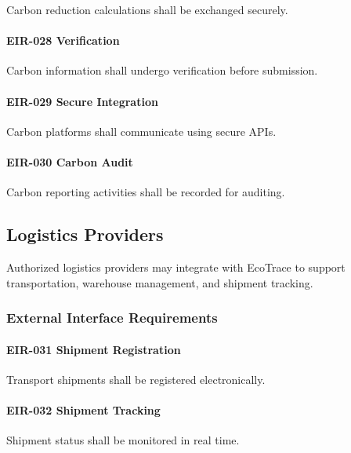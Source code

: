 Carbon reduction calculations shall be exchanged securely.

\paragraph{EIR-028 Verification}

Carbon information shall undergo verification before submission.

\paragraph{EIR-029 Secure Integration}

Carbon platforms shall communicate using secure APIs.

\paragraph{EIR-030 Carbon Audit}

Carbon reporting activities shall be recorded for auditing.


\subsection{Logistics Providers}

Authorized logistics providers may integrate with EcoTrace to support
transportation, warehouse management, and shipment tracking.


\subsubsection*{External Interface Requirements}

\paragraph{EIR-031 Shipment Registration}

Transport shipments shall be registered electronically.

\paragraph{EIR-032 Shipment Tracking}

Shipment status shall be monitored in real time.

